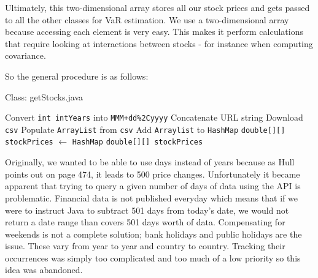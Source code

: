 \documentclass[../Dissertation.tex]{subfiles}
\begin{document}
Ultimately, this two-dimensional array stores all our stock prices and gets passed to all the other classes for VaR estimation.
We use a two-dimensional array because accessing each element is very easy.
This makes it perform calculations that require looking at interactions between stocks - for instance when computing covariance.

So the general procedure is as follows:
					\begin{algorithm}[H]
						\caption{Class: getStocks.java}
						\begin{algorithmic}[1]
							\label{class:getStocks}							
							\State Convert \lstinline|int intYears| into \lstinline|MMM+dd%2Cyyyy|
							\State Concatenate URL string
							\State Download \lstinline|csv|
							\State Populate \lstinline|ArrayList| from \lstinline|csv|
							\State Add \lstinline|Arraylist| to \lstinline|HashMap|
							\EndFor
							\State \lstinline|double[][] stockPrices| $\gets$ \lstinline|HashMap|
							\State \Return \lstinline|double[][] stockPrices|
						\EndFunction
						\end{algorithmic}
					\end{algorithm}

Originally, we wanted to be able to use days instead of years because as Hull~\cite{Hull:2012} points out on page 474, it leads to 500 price changes.
Unfortunately it became apparent that trying to query a given number of days of data using the API is problematic.
Financial data is not published everyday which means that if we were to instruct Java to subtract 501 days from today's date, we would not return a date range than covers 501 days worth of data.
Compensating for weekends is not a complete solution; bank holidays and public holidays are the issue.
These vary from year to year and country to country. 
Tracking their occurrences was simply too complicated and too much of a low priority so this idea was abandoned.
\end{document}
